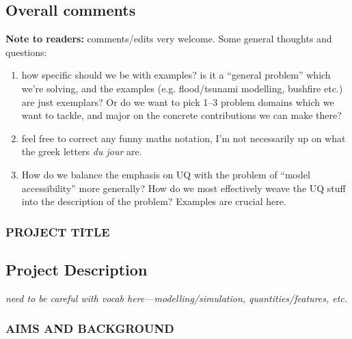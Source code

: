 \documentclass[a4paper,fontsize=12pt]{scrartcl}
\author{}
\date{\today}
\begin{document}
\subsection*{Overall comments}
\label{sec:overall-comments}

\noindent
\textbf{Note to readers:} comments/edits very welcome. Some general
thoughts and questions:
\begin{enumerate}
\item how specific should we be with examples? is it a ``general
  problem'' which we're solving, and the examples (e.g. flood/tsunami
  modelling, bushfire etc.) are just exemplars? Or do we want to pick
  1--3 problem domains which we want to tackle, and major on the
  concrete contributions we can make there?
\item feel free to correct any funny maths notation, I'm not
  necessarily up on what the greek letters \emph{du jour} are.
\item How do we balance the emphasis on UQ with the problem of ``model
  accessibility'' more generally? How do we most effectively weave the
  UQ stuff into the description of the problem? Examples are crucial here.
\end{enumerate}

\renewcommand{\thesection}{\Alph{section}}

\subsubsection*{PROJECT TITLE}

\setcounter{section}{3} %
\subsection{Project Description}
\label{sec:project-description}

\emph{need to be careful with vocab here---modelling/simulation,
  quantities/features, etc.}

\subsubsection*{AIMS AND BACKGROUND}
\end{document}
